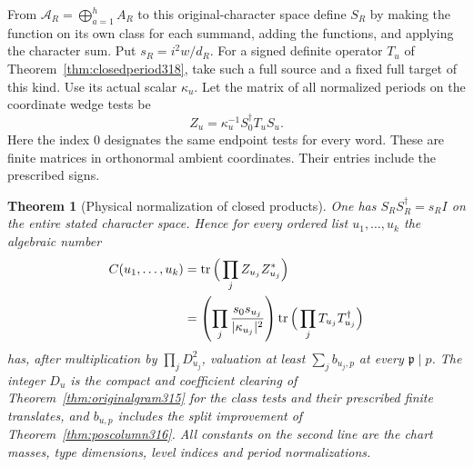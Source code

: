 \documentclass[a4paper,11pt]{article}
\newtheorem{theorem}[proposition]{Theorem}
\theoremstyle{definition}
\theoremstyle{remark}
\numberwithin{equation}{section}
\begin{document}
From \(\mathcal A_R=\bigoplus_{a=1}^h A_R\) to this
original-character space define \(S_R\) by making the
function on its own class for each summand, adding the
functions, and applying the character sum. Put
\(s_R=i^2w/d_R\). For a signed definite operator \(T_u\)
of Theorem~\ref{thm:closedperiod318}, take such a full
source and a fixed full target of this kind. Use its actual
scalar \(\kappa_u\). Let the matrix of all normalized periods
on the coordinate wedge tests be
\[
     Z_u=\kappa_u^{-1} S_0^\dagger T_u S_u .
\]
Here the index \(0\) designates the same endpoint tests for
every word. These are finite matrices in orthonormal ambient
coordinates. Their entries include the prescribed signs.

\begin{theorem}[Physical normalization of closed products]\leavevmode
\label{thm:charttrace320}
One has \(S_R S_R^\dagger=s_R I\) on the entire stated
character space. Hence for every ordered list \(u_1,\ldots,u_k\)
the algebraic number
\[
\begin{split}
 C(u_1,\ldots,u_k)
   &=\operatorname{tr}\Big(\prod_j Z_{u_j}Z_{u_j}^*\Big)\\
   &=\left(\prod_j {s_0s_{u_j}\over|\kappa_{u_j}|^2}\right)
       \operatorname{tr}\Big(\prod_j T_{u_j}T_{u_j}^\dagger\Big)
\end{split}
\]
has, after multiplication by \(\prod_j D_{u_j}^2\), valuation
at least \(\sum_j b_{u_j,p}\) at every \(\mathfrak p\mid p\).
The integer \(D_u\) is the compact and coefficient clearing
of Theorem~\ref{thm:originalgram315} for the class tests and
their prescribed finite translates, and \(b_{u,p}\) includes
the split improvement of Theorem~\ref{thm:poscolumn316}.
All constants on the second line are the chart masses, type
dimensions, level indices and period normalizations.
\end{theorem}
\end{document}
